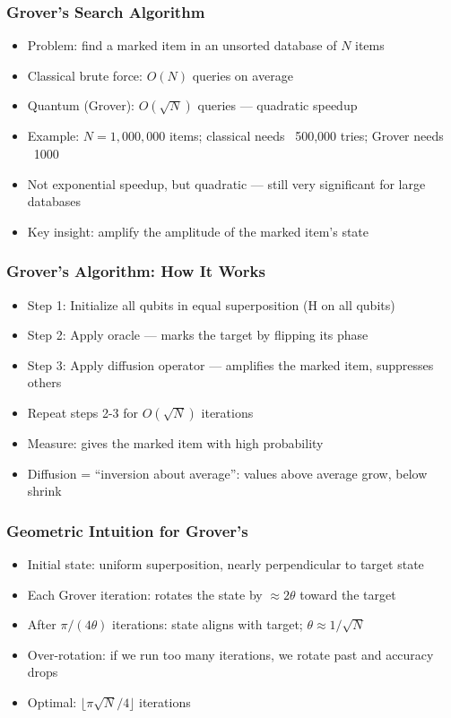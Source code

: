\begin{frame}[fragile]\frametitle{Grover's Search Algorithm}
\begin{itemize}
\item Problem: find a marked item in an unsorted database of $N$ items
\item Classical brute force: $O(N)$ queries on average
\item Quantum (Grover): $O(\sqrt{N})$ queries --- quadratic speedup
\item Example: $N = 1{,}000{,}000$ items; classical needs ~500,000 tries; Grover needs ~1000
\item Not exponential speedup, but quadratic --- still very significant for large databases
\item Key insight: amplify the amplitude of the marked item's state
\end{itemize}
\end{frame}

\begin{frame}[fragile]\frametitle{Grover's Algorithm: How It Works}
\begin{itemize}
\item Step 1: Initialize all qubits in equal superposition (H on all qubits)
\item Step 2: Apply oracle --- marks the target by flipping its phase
\item Step 3: Apply diffusion operator --- amplifies the marked item, suppresses others
\item Repeat steps 2-3 for $O(\sqrt{N})$ iterations
\item Measure: gives the marked item with high probability
\item Diffusion = ``inversion about average'': values above average grow, below shrink
\end{itemize}
\end{frame}

\begin{frame}[fragile]\frametitle{Geometric Intuition for Grover's}
\begin{itemize}
\item Initial state: uniform superposition, nearly perpendicular to target state
\item Each Grover iteration: rotates the state by $\approx 2\theta$ toward the target
\item After $\pi/(4\theta)$ iterations: state aligns with target; $\theta \approx 1/\sqrt{N}$
\item Over-rotation: if we run too many iterations, we rotate past and accuracy drops
\item Optimal: $\lfloor \pi\sqrt{N}/4 \rfloor$ iterations
\end{itemize}
\end{frame}

